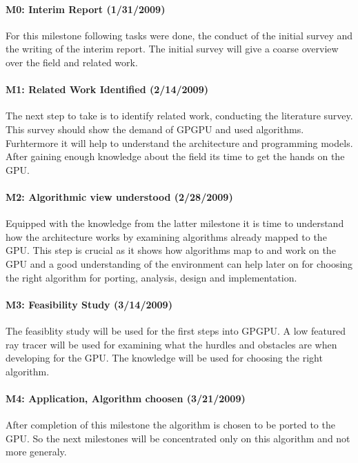 \paragraph{M0: Interim Report (1/31/2009)} %
\label{par:interim_report}
For this milestone following tasks were done, the conduct of the initial survey 
and the writing of the interim report. The initial survey will give a coarse 
overview over the field and related work. 

\paragraph{M1: Related Work Identified (2/14/2009)} %
\label{par:m1_related_work_identified}
The next step to take is to identify related work, conducting the literature 
survey. This survey should show the demand of GPGPU and used algorithms. 
Furhtermore it will help to understand the architecture and programming models. 
After gaining enough knowledge about the field its time to get the hands on the 
GPU.
\paragraph{M2: Algorithmic view understood (2/28/2009)} %
\label{par:m2_architecture_algorithmic_view_understood}
Equipped with the knowledge from the latter milestone it is time to understand
how the architecture works by examining algorithms already mapped to the GPU.
This step is crucial as it shows how algorithms map to and work on the \gls{GPU}
and a good understanding of the environment can help later on for choosing the
right algorithm for porting, analysis, design and implementation.
\paragraph{M3: Feasibility Study (3/14/2009)} %
\label{par:m3_feasibility_study}
The feasiblity study will be used for the first steps into GPGPU. A low featured
ray tracer will be used for examining what the hurdles and obstacles are when 
developing for the GPU. The knowledge will be used for choosing the right 
algorithm. 
\paragraph{M4: Application, Algorithm choosen (3/21/2009)} %
\label{par:m4_application_algorithm_choosen}
After completion of this milestone the algorithm is chosen to be ported to the 
GPU. So the next milestones will be concentrated only on this algorithm and not 
more generaly. 
